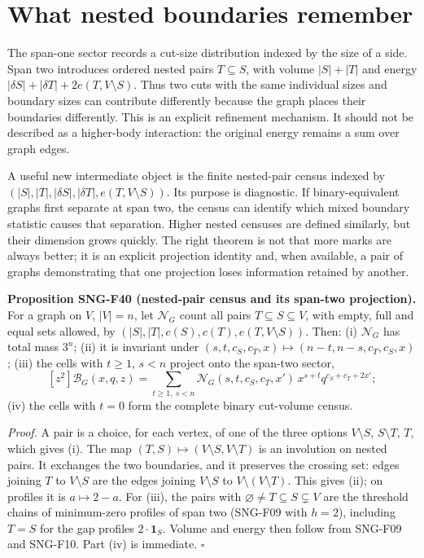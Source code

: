 \documentclass[
  11pt,
  a4paper,
]{report}
\begin{document}
\hypertarget{what-nested-boundaries-remember}{%
\section{What nested boundaries
remember}\label{what-nested-boundaries-remember}}

The span-one sector records a cut-size distribution indexed by the size
of a side. Span two introduces ordered nested pairs \(T\subseteq S\),
with volume \(|S|+|T|\) and energy
\(|\delta S|+|\delta T|+2e(T,V\setminus S)\). Thus two cuts with the
same individual sizes and boundary sizes can contribute differently
because the graph places their boundaries differently. This is an
explicit refinement mechanism. It should not be described as a
higher-body interaction: the original energy remains a sum over graph
edges.

A useful new intermediate object is the finite nested-pair census
indexed by \((|S|,|T|,|\delta S|,|\delta T|,e(T,V\setminus S))\). Its
purpose is diagnostic. If binary-equivalent graphs first separate at
span two, the census can identify which mixed boundary statistic causes
that separation. Higher nested censuses are defined similarly, but their
dimension grows quickly. The right theorem is not that more marks are
always better; it is an explicit projection identity and, when
available, a pair of graphs demonstrating that one projection loses
information retained by another.

\textbf{Proposition SNG-F40 (nested-pair census and its span-two
projection).} For a graph on \(V\), \(|V|=n\), let \(\mathcal N_G\)
count all pairs \(T\subseteq S\subseteq V\), with empty, full and equal
sets allowed, by \((|S|,|T|,c(S),c(T),e(T,V\setminus S))\). Then: (i)
\(\mathcal N_G\) has total mass \(3^n\); (ii) it is invariant under
\((s,t,c_S,c_T,x)\mapsto(n-t,n-s,c_T,c_S,x)\); (iii) the cells with
\(t\ge1\), \(s<n\) project onto the span-two sector, \[
[z^2]\mathcal B_G(x,q,z)=\sum_{t\ge1,\ s<n}\mathcal N_G(s,t,c_S,c_T,x')\,x^{s+t}q^{c_S+c_T+2x'};
\] (iv) the cells with \(t=0\) form the complete binary cut-volume
census.

\emph{Proof.} A pair is a choice, for each vertex, of one of the three
options \(V\setminus S\), \(S\setminus T\), \(T\), which gives (i). The
map \((T,S)\mapsto(V\setminus S,V\setminus T)\) is an involution on
nested pairs. It exchanges the two boundaries, and it preserves the
crossing set: edges joining \(T\) to \(V\setminus S\) are the edges
joining \(V\setminus S\) to \(V\setminus(V\setminus T)\). This gives
(ii); on profiles it is \(a\mapsto2-a\). For (iii), the pairs with
\(\varnothing\ne T\subseteq S\subsetneq V\) are the threshold chains of
minimum-zero profiles of span two (SNG-F09 with \(h=2\)), including
\(T=S\) for the gap profiles \(2\cdot\mathbf1_S\). Volume and energy
then follow from SNG-F09 and SNG-F10. Part (iv) is immediate.
\(\square\)
\end{document}
